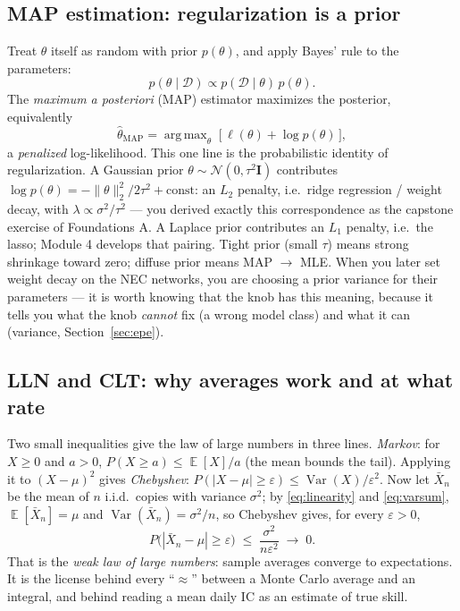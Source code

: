 \documentclass[11pt]{article}
\numberwithin{equation}{section}
\theoremstyle{plain}
\theoremstyle{definition}
\theoremstyle{remark}
\newcounter{exercise}
\DeclareMathOperator{\E}{\mathbb{E}}
\DeclareMathOperator{\Var}{Var}
\DeclareMathOperator*{\argmax}{arg\,max}
\newcommand{\Normal}{\mathcal{N}}
\begin{document}
\subsection{MAP estimation: regularization is a prior}\label{sec:map}

Treat $\theta$ itself as random with prior $p(\theta)$, and apply Bayes' rule to the parameters:
\begin{equation}
p(\theta \mid \mathcal{D}) \propto p(\mathcal{D} \mid \theta)\, p(\theta).
\end{equation}
The \emph{maximum a posteriori} (MAP) estimator maximizes the posterior, equivalently
\begin{equation}
\hat\theta_{\mathrm{MAP}}
= \argmax_\theta \;\big[\, \ell(\theta) + \log p(\theta) \,\big],
\label{eq:map}
\end{equation}
a \emph{penalized} log-likelihood. This one line is the probabilistic identity of regularization. A Gaussian prior $\theta \sim \Normal(0, \tau^2 \bm{I})$ contributes $\log p(\theta) = -\|\theta\|_2^2 / 2\tau^2 + \text{const}$: an $L_2$ penalty, i.e.\ ridge regression / weight decay, with $\lambda \propto \sigma^2/\tau^2$ --- you derived exactly this correspondence as the capstone exercise of Foundations A. A Laplace prior contributes an $L_1$ penalty, i.e.\ the lasso; Module 4 develops that pairing. Tight prior (small $\tau$) means strong shrinkage toward zero; diffuse prior means MAP $\to$ MLE. When you later set weight decay on the NEC networks, you are choosing a prior variance for their parameters --- it is worth knowing that the knob has this meaning, because it tells you what the knob \emph{cannot} fix (a wrong model class) and what it can (variance, Section~\ref{sec:epe}).

\subsection{LLN and CLT: why averages work and at what rate}\label{sec:llnclt}

Two small inequalities give the law of large numbers in three lines. \emph{Markov}: for $X \ge 0$ and $a > 0$, $P(X \ge a) \le \E[X]/a$ (the mean bounds the tail). Applying it to $(X - \mu)^2$ gives \emph{Chebyshev}: $P(|X - \mu| \ge \varepsilon) \le \Var(X)/\varepsilon^2$. Now let $\bar{X}_n$ be the mean of $n$ i.i.d.\ copies with variance $\sigma^2$; by \eqref{eq:linearity} and \eqref{eq:varsum}, $\E[\bar X_n] = \mu$ and $\Var(\bar X_n) = \sigma^2 / n$, so Chebyshev gives, for every $\varepsilon > 0$,
\begin{equation}
P\big(|\bar{X}_n - \mu| \ge \varepsilon\big) \;\le\; \frac{\sigma^2}{n \varepsilon^2} \;\longrightarrow\; 0 .
\end{equation}
That is the \emph{weak law of large numbers}: sample averages converge to expectations. It is the license behind every ``$\approx$'' between a Monte Carlo average and an integral, and behind reading a mean daily IC as an estimate of true skill.
\end{document}
